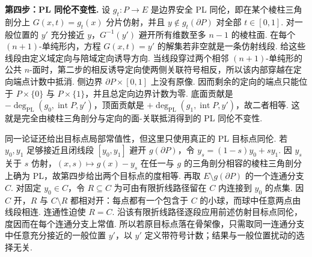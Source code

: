 \begin{FAProof}
\textbf{第四步：PL 同伦不变性.} 设 \(\displaystyle g_t:P\to E\) 是边界安全 PL 同伦，即在某个棱柱三角剖分上 \(\displaystyle G(x,t)=g_t(x)\) 分片仿射，并且 \(\displaystyle y\notin g_t(\partial P)\) 对全部 \(\displaystyle t\in[0,1]\). 对一般位置的 \(\displaystyle y'\) 充分接近 \(\displaystyle y\)，\(\displaystyle G^{-1}(y')\) 避开所有维数至多 \(\displaystyle n-1\) 的棱柱面. 在每个 \(\displaystyle(n+1)\)-单纯形内，方程 \(\displaystyle G(x,t)=y'\) 的解集若非空就是一条仿射线段. 给这些线段由定义域定向与陪域定向诱导方向. 当线段穿过两个相邻 \(\displaystyle(n+1)\)-单纯形的公共 \(\displaystyle n\)-面时，第二步的相反诱导定向使两侧关联符号相反，所以该内部穿越在定向端点计数中抵消. 侧边界 \(\displaystyle\partial P\times[0,1]\) 上没有原像. 因而剩余的定向的端点只能位于 \(\displaystyle P\times\{0\}\) 与 \(\displaystyle P\times\{1\}\)，并且总定向边界计数为零. 底面贡献是 \(\displaystyle-\deg_{\mathrm{PL}}(g_0,\operatorname{int}P,y')\)，顶面贡献是 \(\displaystyle+\deg_{\mathrm{PL}}(g_1,\operatorname{int}P,y')\)，故二者相等. 这就是完全由棱柱三角剖分与定向的面-关联抵消得到的 PL 同伦不变性.

同一论证还给出目标点局部常值性，但这里只使用真正的 PL 目标点同伦. 若 \(\displaystyle y_0,y_1\) 足够接近且闭线段 \(\displaystyle[y_0,y_1]\) 避开 \(\displaystyle g(\partial P)\)，令 \(\displaystyle y_s=(1-s)y_0+sy_1\). 因 \(\displaystyle y_s\) 关于 \(\displaystyle s\) 仿射，\(\displaystyle (x,s)\mapsto g(x)-y_s\) 在任一与 \(\displaystyle g\) 的三角剖分相容的棱柱三角剖分上确为 PL，故第四步给出两个目标点的度相等. 再取 \(\displaystyle E\setminus g(\partial P)\) 的一个连通分支 \(\displaystyle C\). 对固定 \(\displaystyle y_0\in C\)，令 \(\displaystyle R\subseteq C\) 为可由有限折线路径留在 \(\displaystyle C\) 内连接到 \(\displaystyle y_0\) 的点集. 因 \(\displaystyle C\) 开，\(\displaystyle R\) 与 \(\displaystyle C\setminus R\) 都相对开：每点都有一个包含于 \(\displaystyle C\) 的小球，而球中任意两点由线段相连. 连通性迫使 \(\displaystyle R=C\). 沿该有限折线路径逐段应用前述仿射目标点同伦，度因而在每个连通分支上常值. 所以若原目标点落在骨架像，只需取同一连通分支中任意充分接近的一般位置 \(\displaystyle y'\)，以 \(\displaystyle y'\) 定义带符号计数；结果与一般位置扰动的选择无关.


\end{FAProof}
